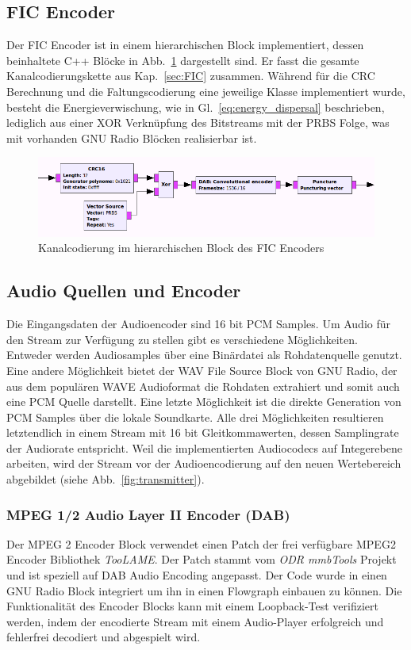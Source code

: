 \subsection{FIC Encoder}
\label{sec:fic_encoder}
Der FIC Encoder ist in einem hierarchischen Block implementiert, dessen beinhaltete C++ Blöcke in Abb.~\ref{fig:fic_encoder} dargestellt sind. Er fasst die gesamte Kanalcodierungskette aus Kap.~\ref{sec:FIC} zusammen. Während für die CRC Berechnung und die Faltungscodierung eine jeweilige Klasse implementiert wurde, besteht die Energieverwischung, wie in Gl.~\ref{eq:energy_dispersal} beschrieben, lediglich aus einer XOR Verknüpfung des Bitstreams mit der PRBS Folge, was mit vorhanden GNU Radio Blöcken realisierbar ist.

\begin{figure}[ht]
\centering
  \includegraphics[width=\textwidth]{figures/FIC_encoder.png}
	\caption{Kanalcodierung im hierarchischen Block des FIC Encoders}
	\label{fig:fic_encoder}
\end{figure}

\subsection{Audio Quellen und Encoder}
Die Eingangsdaten der Audioencoder sind 16 bit \ac{PCM} Samples. Um Audio für den Stream zur Verfügung zu stellen gibt es verschiedene Möglichkeiten. Entweder werden Audiosamples über eine Binärdatei als Rohdatenquelle genutzt. Eine andere Möglichkeit bietet der \glqq WAV File Source\grqq{} Block von GNU Radio, der aus dem populären \glqq WAVE\grqq{} Audioformat die Rohdaten extrahiert und somit auch eine PCM Quelle darstellt. Eine letzte Möglichkeit ist die direkte Generation von PCM Samples über die lokale Soundkarte. Alle drei Möglichkeiten resultieren letztendlich in einem Stream mit 16 bit Gleitkommawerten, dessen Samplingrate der Audiorate entspricht. Weil die implementierten Audiocodecs auf Integerebene arbeiten, wird der Stream vor der Audioencodierung auf den neuen Wertebereich abgebildet (siehe Abb.~\ref{fig:transmitter}).

\subsubsection{MPEG 1/2 Audio Layer II Encoder (DAB)}
Der MPEG 2 Encoder Block verwendet einen Patch der frei verfügbare MPEG2 Encoder Bibliothek \textit{TooLAME}. Der Patch stammt vom \textit{ODR mmbTools} Projekt \cite{repo:odr_audioenc} und ist speziell auf DAB Audio Encoding angepasst. Der Code wurde in einen GNU Radio Block integriert um ihn in einen Flowgraph einbauen zu können. Die Funktionalität des Encoder Blocks kann mit einem Loopback-Test verifiziert werden, indem der encodierte Stream mit einem Audio-Player erfolgreich und fehlerfrei decodiert und abgespielt wird.


